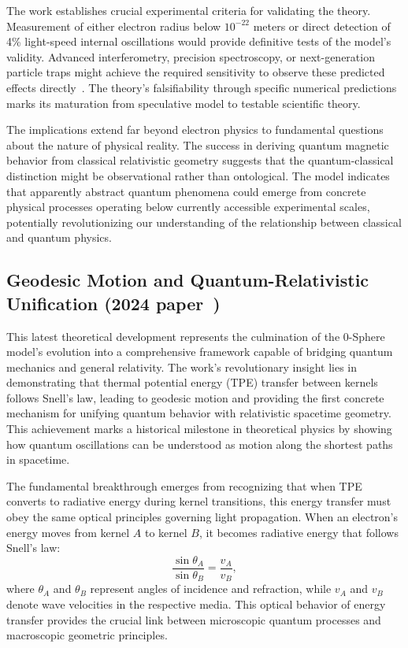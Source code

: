 \documentclass[%
 reprint,
 amsmath,amssymb,
 aps,
]{revtex4-1}
\numberwithin{equation}{section}%
\begin{document}
The work establishes crucial experimental criteria for validating the theory. Measurement of either electron radius below $10^{-22}$ meters or direct detection of 4\% light-speed internal oscillations would provide definitive tests of the model's validity. Advanced interferometry, precision spectroscopy, or next-generation particle traps might achieve the required sensitivity to observe these predicted effects directly~\cite{dehmelt1988}. The theory's falsifiability through specific numerical predictions marks its maturation from speculative model to testable scientific theory.

The implications extend far beyond electron physics to fundamental questions about the nature of physical reality. The success in deriving quantum magnetic behavior from classical relativistic geometry suggests that the quantum-classical distinction might be observational rather than ontological. The model indicates that apparently abstract quantum phenomena could emerge from concrete physical processes operating below currently accessible experimental scales, potentially revolutionizing our understanding of the relationship between classical and quantum physics.

\subsection{Geodesic Motion and Quantum-Relativistic Unification (2024 paper~\cite{hanamura2411.0117})}

This latest theoretical development represents the culmination of the 0-Sphere model's evolution into a comprehensive framework capable of bridging quantum mechanics and general relativity. The work's revolutionary insight lies in demonstrating that thermal potential energy (TPE) transfer between kernels follows Snell's law, leading to geodesic motion and providing the first concrete mechanism for unifying quantum behavior with relativistic spacetime geometry. This achievement marks a historical milestone in theoretical physics by showing how quantum oscillations can be understood as motion along the shortest paths in spacetime.

The fundamental breakthrough emerges from recognizing that when TPE converts to radiative energy during kernel transitions, this energy transfer must obey the same optical principles governing light propagation. When an electron's energy moves from kernel $A$ to kernel $B$, it becomes radiative energy that follows Snell's law:
\begin{equation}
\frac{\sin\theta_A}{\sin\theta_B} = \frac{v_A}{v_B},
\end{equation}
where $\theta_A$ and $\theta_B$ represent angles of incidence and refraction, while $v_A$ and $v_B$ denote wave velocities in the respective media. This optical behavior of energy transfer provides the crucial link between microscopic quantum processes and macroscopic geometric principles.
\end{document}
